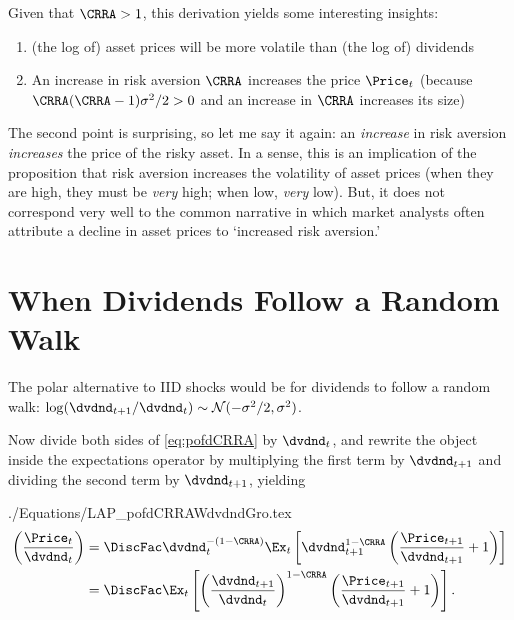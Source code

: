 \documentclass{handout}
\begin{document}
Given that $\CRRA > 1$, this derivation yields some interesting insights:
\begin{enumerate}
  \item (the log of) asset prices will be more volatile than (the log of) dividends
  \item An increase in risk aversion $\CRRA$ increases the price $\Price_{t}$ (because $\CRRA(\CRRA-1)\sigma^{2}/2 > 0$ and an increase in $\CRRA$ increases its size)  %
\end{enumerate}

The second point is surprising, so let me say it again: an \textit{increase} in risk aversion \textit{increases} the price of the risky asset.  In a sense, this is an implication of the proposition that risk aversion increases the volatility of asset prices (when they are high, they must be \textit{very} high; when low, \textit{very} low).  But, it does not correspond very well to the common narrative in which market analysts often attribute a decline in asset prices to `increased risk aversion.'  

\section{When Dividends Follow a Random Walk}

The polar alternative to IID shocks would be for dividends to follow a random walk: $\log (\dvdnd_{t+1}/\dvdnd_{t}) \sim \mathcal{N}(-\sigma^{2}/2,\sigma^{2})$.

Now divide both sides of \eqref{eq:pofdCRRA} by $\dvdnd_{t}$, and rewrite the object inside the expectations operator by multiplying the first term by $\dvdnd_{t+1}$ and dividing the second term by $\dvdnd_{t+1}$, yielding
\begin{verbatimwrite}{./Equations/LAP_pofdCRRAWdvdndGro.tex}
\begin{equation}\begin{gathered}\begin{aligned}
 \left(\frac{\Price_{t}}{\dvdnd_{t}}\right) & =  \DiscFac \dvdnd_{t}^{-(1-\CRRA)} \Ex_{t}\left[\dvdnd_{t+1}^{1-\CRRA}\left(\frac{\Price_{t+1}}{\dvdnd_{t+1}}+1\right)\right] 
\\ & =   \DiscFac  \Ex_{t}\left[\left(\frac{\dvdnd_{t+1}}{\dvdnd_{t}}\right)^{1-\CRRA}\left(\frac{\Price_{t+1}}{\dvdnd_{t+1}}+1\right)\right] \label{eq:pofdCRRAWdvdndGro}
.
\end{aligned}\end{gathered}\end{equation}
\end{verbatimwrite}

\end{document}

